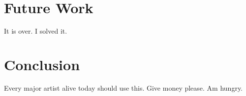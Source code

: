 \documentclass[a4paper,english]{report}
\begin{document}
	
	\chapter{Future Work}
	
	It is over. I solved it. 
	
	\chapter{Conclusion}
	Every major artist alive today should use this. Give money please. Am hungry.
	 
\end{document}
